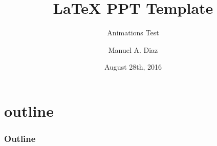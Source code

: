 

\title[Manuel A. Diaz - NHRI 2016 \hspace{4em}\insertframenumber/
\inserttotalframenumber]{~ \LaTeX\; PPT Template ~} %
\subtitle{Animations Test}
\author[Biomedical Simulation Laboratory]{ Manuel A. Diaz } %
\date{August 28th, 2016}



\frame{\maketitle}

\section*{outline} 
\begin{frame}%
	\frametitle{Outline}
	\tableofcontents
\end{frame}






%	
%	


